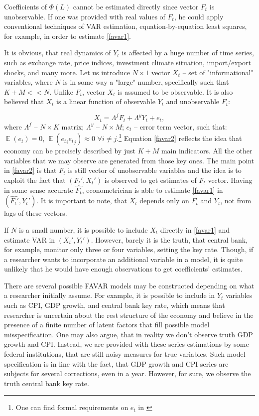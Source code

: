\documentclass[a4paper, 14pt]{article}
\DeclareMathOperator*{\E}{\mathbb{E}}
\begin{document}
Coefficients of $\Phi(L)$ cannot be estimated directly since vector $F_t$ is unobservable. If one was provided with real values of $F_t$, he could apply conventional techniques of VAR estimation, equation-by-equation least squares, for example, in order to estimate \eqref{favar1}. 

It is obvious, that real dynamics of $Y_t$ is affected by a huge number of time series, such as exchange rate, price indices, investment climate situation, import/export shocks, and many more. Let us introduce $N\times 1$ vector $X_t$ -- set of "informational" variables, where $N$ is in some way a "large" number, specifically such that $K+M << N$. Unlike $F_t$, vector $X_t$ is assumed to be observable. It is also believed that $X_t$ is a linear function of observable $Y_t$ and unobservable $F_t$:

\begin{equation}\label{favar2}
X_t = \Lambda^f F_t + \Lambda^y Y_t + e_t,
\end{equation}
where $\Lambda^f$ -- $N \times K$ matrix; $\Lambda^y$ -- $N \times M$; $e_t$ -- error term vector, such that: $\E(e_t) = 0$, $\E({e_t}_i {e_t}_j) \approx 0$ $\forall i \neq j$.\footnote{One can find formal requirements on $e_t$ in \cite{stock2002macroeconomic}} Equation \eqref{favar2} reflects the idea that economy can be precisely described by just $K+M$ main indicators. All the other variables that we may observe are generated from those key ones. The main point in \eqref{favar2} is that $F_t$ is still vector of unobservable variables and the idea is to exploit the fact that $(F_t', X_t')$ is observed to get estimates of $F_t$ vector. Having in some sense accurate $\hat{F_t}$, econometrician is able to estimate \eqref{favar1} in $(\hat{F_t'}, Y_t')$. It is important to note, that $X_t$ depends only on $F_t$ and $Y_t$, not from lags of these vectors. 

If $N$ is a small number, it is possible to include $X_t$ directly in \eqref{favar1} and estimate VAR in $({X_t'}, Y_t')$. However, barely it is the truth, that central bank, for example, monitor only three or four variables, setting the key rate. Though, if a researcher wants to incorporate an additional variable in a model, it is quite unlikely that he would have enough observations to get coefficients' estimates. 

There are several possible FAVAR models may be constructed depending on what a researcher initially assume. For example, it is possible to include in $Y_t$ variables such as CPI, GDP growth, and central bank key rate, which means that researcher is uncertain about the rest structure of the economy and believe in the presence of a finite number of latent factors that fill possible model misspecification. One may also argue, that in reality we don't observe truth GDP growth and CPI. Instead, we are provided with these series estimations by some federal institutions, that are still noisy measures for true variables. Such model specification is in line with the fact, that GDP growth and CPI series are subjects for several corrections, even in a year. However, for sure, we observe the truth central bank key rate.
\end{document}
